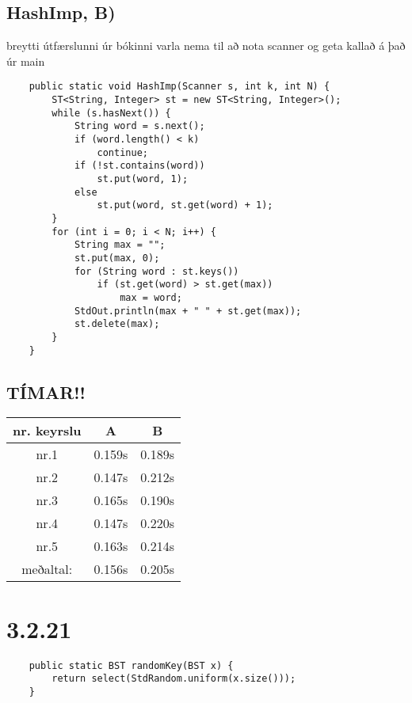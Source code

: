 \documentclass{article}
\begin{document}
\newpage
\subsection*{HashImp, B)}
breytti útfærslunni úr bókinni varla nema til að nota scanner og geta kallað á það úr main
\begin{lstlisting}
    public static void HashImp(Scanner s, int k, int N) {
        ST<String, Integer> st = new ST<String, Integer>();
        while (s.hasNext()) { 
            String word = s.next();
            if (word.length() < k)
                continue;
            if (!st.contains(word))
                st.put(word, 1);
            else
                st.put(word, st.get(word) + 1);
        }
        for (int i = 0; i < N; i++) {
            String max = "";
            st.put(max, 0);
            for (String word : st.keys())
                if (st.get(word) > st.get(max))
                    max = word;
            StdOut.println(max + " " + st.get(max));
            st.delete(max);
        }
    }
\end{lstlisting}

\subsection*{TÍMAR!!}
\begin{center}
    \begin{tabular}{|c|c|c|}
        \hline
        nr. keyrslu&A&B\\
        \hline
        nr.1&0.159s&0.189s\\
        \hline
        nr.2&0.147s&0.212s\\
        \hline
        nr.3&0.165s&0.190s\\
        \hline
        nr.4&0.147s&0.220s\\
        \hline
        nr.5&0.163s&0.214s\\
        \hline
        meðaltal:&0.156s&0.205s\\
        \hline
    \end{tabular}
\end{center}

\section*{3.2.21}
\begin{lstlisting}
    public static BST randomKey(BST x) {
        return select(StdRandom.uniform(x.size()));
    }
\end{lstlisting}
\end{document}
